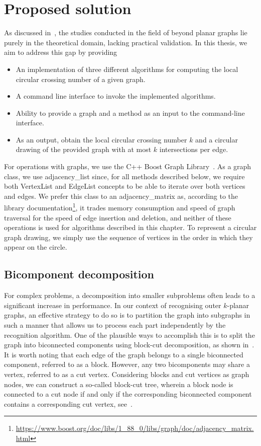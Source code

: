 \chapter{Proposed solution}\label{ch:proposed-solution}

As discussed in~, the studies conducted in the field of beyond planar graphs lie purely in the theoretical domain, lacking practical validation. In this thesis, we aim to address this gap by providing
\begin{itemize}
    \item An implementation of three different algorithms for computing the local circular crossing number of a given graph.
    \item A command line interface to invoke the implemented algorithms.
    \item Ability to provide a graph and a method as an input to the command-line interface.
    \item As an output, obtain the local circular crossing number \(k\) and a circular drawing of the provided graph with at most \(k\) intersections per edge.
\end{itemize}


For operations with graphs, we use the C++ Boost Graph Library~\cite{boost}. As a graph class, we use \textsf{adjacency\_list} since, for all methods described below, we require both \textsf{VertexList} and \textsf{EdgeList} concepts to be able to iterate over both vertices and edges. We prefer this class to an \textsf{adjacency\_matrix} as, according to the library documentation\footnote{\url{https://www.boost.org/doc/libs/1_88_0/libs/graph/doc/adjacency_matrix.html}}, it trades memory consumption and speed of graph traversal for the speed of edge insertion and deletion, and neither of these operations is used for algorithms described in this chapter. To represent a circular graph drawing, we simply use the sequence of vertices in the order in which they appear on the circle.


\section{Bicomponent decomposition}

For complex problems, a decomposition into smaller subproblems often leads to a significant increase in performance. In our context of recognising outer \(k\)-planar graphs, an effective strategy to do so is to partition the graph into subgraphs in such a manner that allows us to process each part independently by the recognition algorithm. One of the plausible ways to accomplish this is to split the graph into biconnected components using block-cut decomposition, as shown in~. It is worth noting that each edge of the graph belongs to a single biconnected component, referred to as a block. However, any two bicomponents may share a vertex, referred to as a cut vertex. Considering blocks and cut vertices as graph nodes, we can construct a so-called block-cut tree, wherein a block node is connected to a cut node if and only if the corresponding biconnected component contains a corresponding cut vertex, see~.

